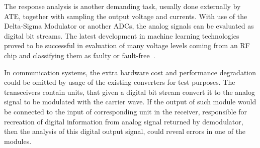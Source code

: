 The response analysis is another demanding task, usually done externally by ATE, together with sampling the output voltage and currents. With use of the Delta-Sigma Modulator or another ADCs, the analog signals can be evaluated as digital bit streams. The latest development in machine learning technologies proved to be successful in evaluation of many voltage levels coming from an RF chip and classifying them as faulty or fault-free~\cite{art:neural}.

In communication systems, the extra hardware cost and performance degradation could be omitted by usage of the existing converters for test purposes. The transceivers contain units, that given a digital bit stream convert it to the analog signal to be modulated with the carrier wave. If the output of such module would be connected to the input of corresponding unit in the receiver, responsible for recreation of digital information from analog signal returned by demodulator, then the analysis of this digital output signal, could reveal errors in one of the modules.